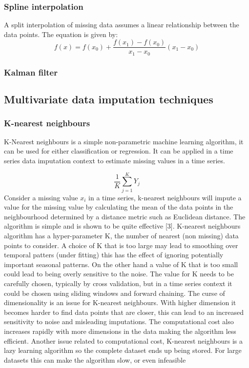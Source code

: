 \documentclass[
]{report}
\begin{document}
\subsubsection{Spline interpolation}\label{spline-interpolation}

A split interpolation of missing data assumes a linear relationship
between the data points. The equation is given by:
\begin{equation}\label{eqn:Split_interp}
f(x) = f(x_0) + \frac{f(x_1)-f(x_0)}{x_1-x_0}(x_1 - x_0)
\end{equation}

\subsubsection{Kalman filter}\label{kalman-filter}

\subsection{Multivariate data imputation
techniques}\label{multivariate-data-imputation-techniques}

\subsubsection{K-nearest neighbours}\label{k-nearest-neighbours}

K-Nearest neighbours is a simple non-parametric machine learning
algorithm, it can be used for either classification or regression. It
can be applied in a time series data imputation context to estimate
missing values in a time series.

\[\frac{1}{K}\sum_{j=1}^K Y_j\] Consider a missing value \(x_i\) in a
time series, k-nearest neighbours will impute a value for the missing
value by calculating the mean of the data points in the neighbourhood
determined by a distance metric such as Euclidean distance. The
algorithm is simple and is shown to be quite effective {[}3{]}.
K-nearest neighbours algorithm has a hyper-parameter K, the number of
nearest (non missing) data points to consider. A choice of K that is too
large may lead to smoothing over temporal patters (under fitting) this
has the effect of ignoring potentially important seasonal patterns. On
the other hand a value of K that is too small could lead to being overly
sensitive to the noise. The value for K needs to be carefully chosen,
typically by cross validation, but in a time series context it could be
chosen using sliding windows and forward chaining. The curse of
dimensionality is an issue for K-nearest neighbours. With higher
dimension it becomes harder to find data points that are closer, this
can lead to an increased sensitivity to noise and misleading
imputations. The computational cost also increases rapidly with more
dimensions in the data making the algorithm less efficient. Another
issue related to computational cost, K-nearest neighbours is a lazy
learning algorithm so the complete dataset ends up being stored. For
large datasets this can make the algorithm slow, or even infeasible
\end{document}
